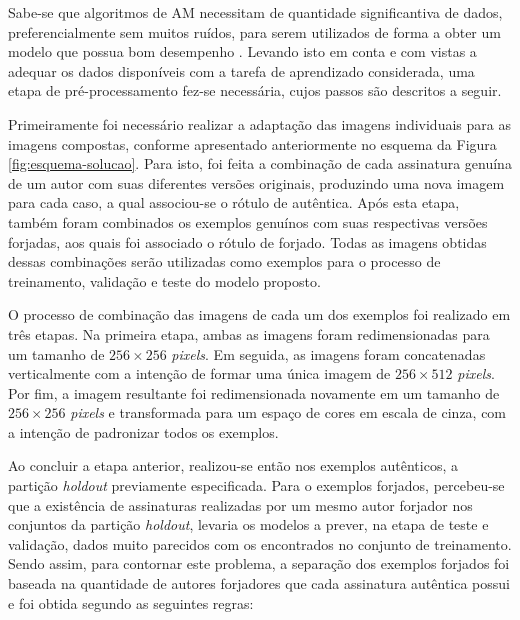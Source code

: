 
Sabe-se que algoritmos de AM necessitam de quantidade significantiva de dados, preferencialmente sem muitos ruídos, para serem utilizados de forma a obter um modelo que possua bom desempenho \cite{marsland}. Levando isto em conta e com vistas a adequar os dados disponíveis com a tarefa de aprendizado considerada, uma etapa de pré-processamento fez-se necessária, cujos passos são descritos a seguir.

Primeiramente foi necessário realizar a adaptação das imagens individuais para as imagens compostas, conforme apresentado anteriormente no esquema da Figura \ref{fig:esquema-solucao}. Para isto, foi feita a combinação de cada assinatura genuína de um autor com suas diferentes versões originais, produzindo uma nova imagem para cada caso, a qual associou-se o rótulo de autêntica. Após esta etapa, também foram combinados os exemplos genuínos com suas respectivas versões forjadas, aos quais foi associado o rótulo de forjado. Todas as imagens obtidas dessas combinações serão utilizadas como exemplos para o processo de treinamento, validação e teste do modelo proposto.

O processo de combinação das imagens de cada um dos exemplos foi realizado em três etapas. Na primeira etapa, ambas as imagens foram redimensionadas para um tamanho de $256 \times 256$ \emph{pixels}. Em seguida, as imagens foram concatenadas verticalmente com a intenção de formar uma única imagem de $256 \times 512$ \emph{pixels}. Por fim, a imagem resultante foi redimensionada novamente em um tamanho de $256 \times 256$ \emph{pixels} e transformada para um espaço de cores em escala de cinza, com a intenção de padronizar todos os exemplos.

Ao concluir a etapa anterior, realizou-se então nos exemplos autênticos, a partição \emph{holdout} previamente especificada. Para o exemplos forjados, percebeu-se que a existência de assinaturas realizadas por um mesmo autor forjador nos conjuntos da partição \emph{holdout}, levaria os modelos a prever, na etapa de teste e validação, dados muito parecidos com os encontrados no conjunto de treinamento. Sendo assim, para contornar este problema, a separação dos exemplos forjados foi baseada na quantidade de autores forjadores que cada assinatura autêntica possui e foi obtida segundo as seguintes regras:

